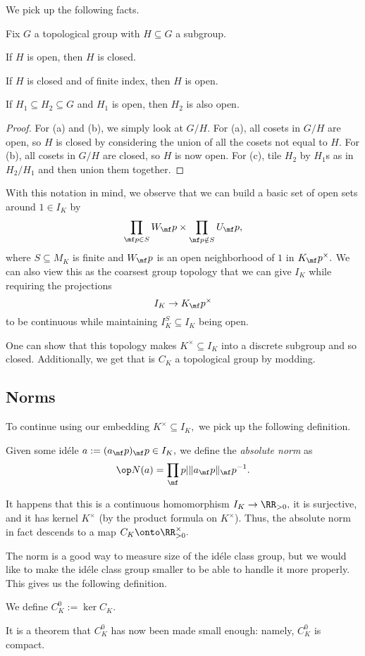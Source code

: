 We pick up the following facts.
\begin{proposition}
	Fix $G$ a topological group with $H\subseteq G$ a subgroup.
	\begin{listalph}
		\item If $H$ is open, then $H$ is closed.
		\item If $H$ is closed and of finite index, then $H$ is open.
		\item If $H_1\subseteq H_2\subseteq G$ and $H_1$ is open, then $H_2$ is also open.
	\end{listalph}
\end{proposition}
\begin{proof}
	For (a) and (b), we simply look at $G/H.$ For (a), all cosets in $G/H$ are open, so $H$ is closed by considering the union of all the cosets not equal to $H.$ For (b), all cosets in $G/H$ are closed, so $H$ is now open. For (c), tile $H_2$ by $H_1$s as in $H_2/H_1$ and then union them together.
\end{proof}
With this notation in mind, we observe that we can build a basic set of open sets around $1\in I_K$ by
\[\prod_{\mf p\in S}W_\mf p\times\prod_{\mf p\notin S}U_\mf p,\]
where $S\subseteq M_K$ is finite and $W_\mf p$ is an open neighborhood of $1$ in $K_\mf p^\times.$ We can also view this as the coarsest group topology that we can give $I_K$ while requiring the projections
\[I_K\to K_\mf p^\times\]
to be continuous while maintaining $I_K^S\subseteq I_K$ being open.

One can show that this topology makes $K^\times\subseteq I_K$ into a discrete subgroup and so closed. Additionally, we get that is $C_K$ a topological group by modding.

\subsection{Norms}
To continue using our embedding $K^\times\subseteq I_K,$ we pick up the following definition.
\begin{definition}
	Given some id\'ele $a:=(a_\mf p)_\mf p\in I_K,$ we define the \textit{absolute norm} as
	\[\op N(a)=\prod_\mf p\lvert\lVert a_\mf p\rVert_\mf p^{-1}.\]
\end{definition}
It happens that this is a continuous homomorphism $I_K\to\RR_{>0},$ it is surjective, and it has kernel $K^\times$ (by the product formula on $K^\times$). Thus, the absolute norm in fact descends to a map $C_K\onto\RR^\times_{>0}.$

The norm is a good way to measure size of the id\'ele class group, but we would like to make the id\'ele class group smaller to be able to handle it more properly. This gives us the following definition.
\begin{definition}[\texorpdfstring{$C_K^0$}{}]
	We define $C_K^0:=\ker C_K.$
\end{definition}
It is a theorem that $C_K^0$ has now been made small enough: namely, $C_K^0$ is compact.

